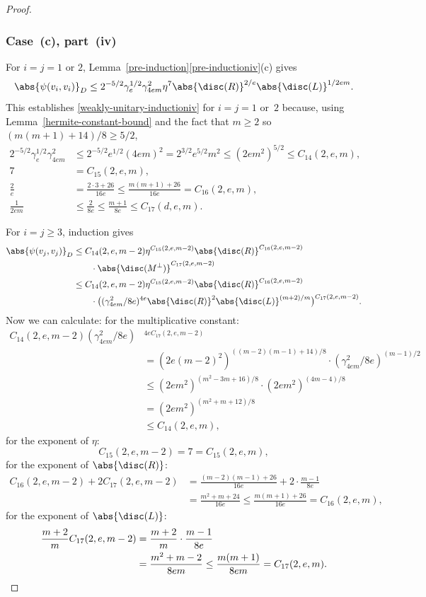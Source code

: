 \begin{proof}
\subsubsection*{Case~(c), part~(iv)}
For $i=j=1$ or $2$, Lemma~\ref{pre-induction}\eqref{pre-inductioniv}(c) gives
\begin{equation} \label{eqn:case-c-iv-base}
\abs{\psi(v_i, v_i)}_D \leq 2^{-5/2} \gamma_e^{1/2} \gamma_{4em}^2 \eta^7 \abs{\disc(R)}^{2/e} \abs{\disc(L)}^{1/2em}.
\end{equation}
This establishes \eqref{weakly-unitary-inductioniv} for $i=j=1$ or~$2$ because, using Lemma~\ref{hermite-constant-bound} and the fact that $m \geq 2$ so $(m(m+1)+14)/8 \geq 5/2$,
\begin{align*}
2^{-5/2} \gamma_e^{1/2} \gamma_{4em}^2
& \leq 2^{-5/2} e^{1/2} (4em)^2
= 2^{3/2} e^{5/2} m^2
\leq (2em^2)^{5/2}
\leq C_{14}(2,e,m),
\\[3pt]
7 & = C_{15}(2,e,m),
\\ \frac{2}{e} & = \frac{2 \cdot 3 + 26}{16e} \leq \frac{m(m+1) + 26}{16e} = C_{16}(2,e,m),
\\ \frac{1}{2em} & \leq \frac{2}{8e} \leq \frac{m+1}{8e} \leq C_{17}(d,e,m).
\end{align*}

For $i=j \geq 3$, induction gives
\begin{align*}
\abs{\psi(v_j, v_j)}_D
& \leq C_{14}(2,e,m-2) \eta^{C_{15}(2,e,m-2)} \abs{\disc(R)}^{C_{16}(2,e,m-2)}
\\& \qquad \cdot \abs{\disc(M^\perp)}^{C_{17}(2,e,m-2)}
\\& \leq C_{14}(2,e,m-2) \eta^{C_{15}(2,e,m-2)} \abs{\disc(R)}^{C_{16}(2,e,m-2)}
\\& \qquad \cdot \bigl( (\gamma_{4em}^2/8e)^{4e} \abs{\disc(R)}^2 \abs{\disc(L)}^{(m+2)/m} \bigr)^{C_{17}(2,e,m-2)}.
\end{align*}
Now we can calculate:
for the multiplicative constant:
\begin{align*}
C_{14}(2,e,m-2) (\gamma_{4em}^2/8e)&^{4eC_{17}(2,e,m-2)}
\\& = (2e(m-2)^2)^{((m-2)(m-1)+14)/8} \cdot (\gamma_{4em}^2/8e)^{(m-1)/2}
\\& \leq (2em^2)^{(m^2-3m+16)/8} \cdot (2em^2)^{(4m-4)/8}
\\& = (2em^2)^{(m^2+m+12)/8}
\\& \leq C_{14}(2,e,m),
\end{align*}
for the exponent of $\eta$:
\[
C_{15}(2,e,m-2) = 7 = C_{15}(2,e,m),
\]
for the exponent of $\abs{\disc(R)}$:
\begin{align*}
C_{16}(2,e,m-2) + 2C_{17}(2,e,m-2)
& = \frac{(m-2)(m-1)+26}{16e} + 2 \cdot \frac{m-1}{8e}
\\& = \frac{m^2+m+24}{16e}
\!\leq\! \frac{m(m+1)+26}{16e}
= C_{16}(2,e,m),
\end{align*}
for the exponent of $\abs{\disc(L)}$:
\begin{align*}
\frac{m+2}{m} C_{17}(2,e,m-2)
& = \frac{m+2}{m} \cdot \frac{m-1}{8e}
\\& = \frac{m^2+m-2}{8em}
\leq \frac{m(m+1)}{8em}
= C_{17}(2,e,m).
\qedhere
\end{align*}
\end{proof}

